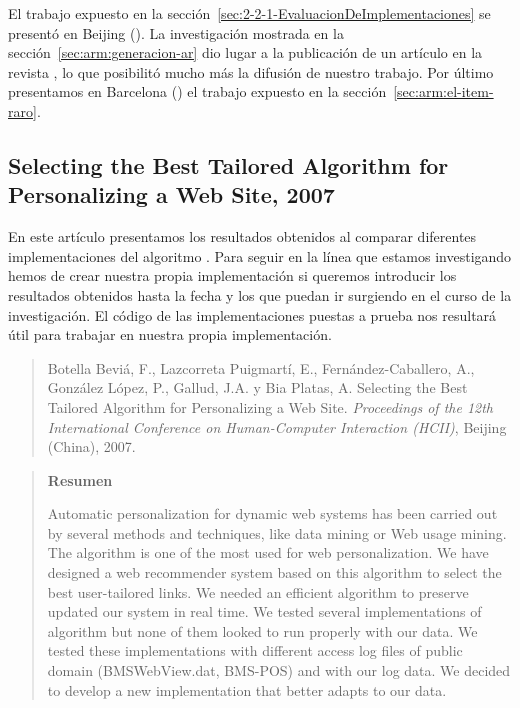 El trabajo expuesto en la sección~\ref{sec:2-2-1-EvaluacionDeImplementaciones} se presentó en Beijing (). La investigación mostrada en la sección~\ref{sec:arm:generacion-ar} dio lugar a la publicación de un artículo en la revista , lo que posibilitó mucho más la difusión de nuestro trabajo. Por último presentamos en Barcelona () el trabajo expuesto en la sección~\ref{sec:arm:el-item-raro}.





\subsection*{Selecting the Best Tailored Algorithm for Personalizing a Web Site, 2007}
\label{sec:nuestro-Selecting-2007}
En este artículo presentamos los resultados obtenidos al comparar diferentes implementaciones del algoritmo \apriori. Para seguir en la línea que estamos investigando hemos de crear nuestra propia implementación si queremos introducir los resultados obtenidos hasta la fecha y los que puedan ir surgiendo en el curso de la investigación. El código de las implementaciones puestas a prueba nos resultará útil para trabajar en nuestra propia implementación.

\begin{quote}
  Botella Beviá, F., Lazcorreta Puigmartí, E., Fernández-Caballero, A., González López, P., Gallud,
J.A. y Bia Platas, A. Selecting the Best Tailored Algorithm for Personalizing a Web Site. \emph{Proceedings of the 12th International Conference on Human-Computer Interaction ({HCII})}, Beijing (China), 2007. 
\end{quote}

\begin{quotation}
	\noindent\textbf{Resumen}

	\nopagebreak Automatic personalization for dynamic web systems has been carried out by several methods and techniques, like data mining or Web usage mining. The \apriori algorithm is one of the most used for web personalization. We have designed a web recommender system based on this algorithm to select the best user-tailored links. We needed an efficient algorithm to preserve updated our system in real time. We tested several implementations of \apriori algorithm but none of them looked to run properly with our data. We tested these implementations with different access log files of public domain (BMSWebView.dat, BMS-POS) and with our log data. We decided to develop a new implementation that better adapts to our data.
\end{quotation}








